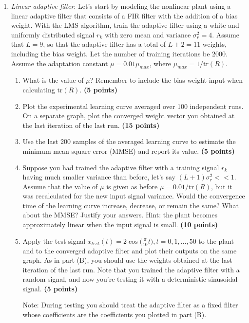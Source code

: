 \documentclass[10pt]{article}
\begin{document}
\begin{enumerate}
	\item\textit{Linear adaptive filter}: Let's start by modeling the nonlinear plant using a linear adaptive filter that consists of a FIR filter with the addition of a bias weight. With the LMS algorithm, train the adaptive filter using a white and uniformly distributed signal $r_k$ with zero mean and variance $\sigma_r^2 = 4$. Assume that $L = 9$, so that the adaptive filter has a total of $L+2 = 11$ weights, including the bias weight. Let the number of training iterations be 2000. Assume the adaptation constant $\mu = 0.01\mu_{max}$, where $\mu_{max} = 1/\mathrm{tr}(R)$. 
	\begin{enumerate}[label=\textbf{(\Alph*)}]
		\item What is the value of $\mu$? Remember to include the bias weight input when calculating $\mathrm{tr}(R)$. \textbf{(5 points)}
		\item Plot the experimental learning curve averaged over 100 independent runs. On a separate graph, plot the converged weight vector you obtained at the last iteration of the last run. \textbf{(15 points)}
		\item Use the last 200 samples of the averaged learning curve to estimate the minimum mean square error (MMSE) and report its value. \textbf{(5 points)}
		\item Suppose you had trained the adaptive filter with a training signal $r_k$ having much smaller variance than before, let's say $(L+1)\sigma_r^2 << 1$. Assume that the value of $\mu$ is given as before $\mu = 0.01/\mathrm{tr}(R)$, but it was recalculated for the new input signal variance. Would the convergence time of the learning curve increase, decrease, or remain the same? What about the MMSE? Justify your answers. Hint: the plant becomes approximately linear when the input signal is small.  \textbf{(10 points)}
		\item Apply the test signal $x_{test}(t) = 2\cos\big(\frac{\pi}{10} t\big), t = 0, 1,\ldots, 50$ to the plant and to the converged adaptive filter and plot their outputs on the same graph. As in part (B), you should use the weights obtained at the last iteration of the last run. Note that you trained the adaptive filter with a random signal, and now you're testing it with a deterministic sinusoidal signal. \textbf{(5 points)}
		
		Note: During testing you should treat the adaptive filter as a fixed filter whose coefficients are the coefficients you plotted in part (B).
	\end{enumerate}
	

\end{enumerate}
\end{document}
